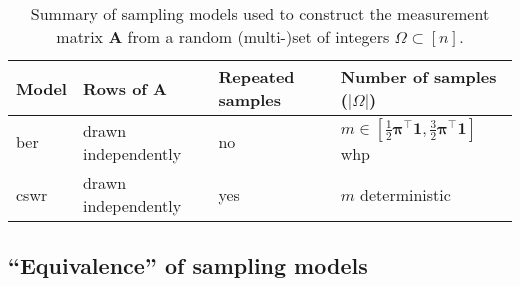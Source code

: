 \begin{table}[H]
    \begin{center}
        \begin{tabular}{ l l l l }
            \hline\noalign{\smallskip}
            Model & Rows of $\mathbf{A}$ & Repeated samples & Number of samples ($|\Omega|$) \\[.1cm]
            \hline\noalign{\smallskip}
            \acrshort{ber} & drawn independently & no & $m \in \left[ \frac{1}{2}\bm{\pi}^{\top} \mathbf{1}, \frac{3}{2}\bm{\pi}^{\top} \mathbf{1} \right ]$ \acrshort{whp} \\[.25cm]
            \acrshort{cswr} & drawn independently & yes & $m$ deterministic \\[.1cm]
            \hline
        \end{tabular}
    \end{center}
    \caption[Summary of sampling models]{Summary of sampling models used to construct the measurement matrix $\mathbf{A}$ from a random (multi-)set of integers $\Omega \subset [n]$.}
    \label{tab:sampling-models}
\end{table}

\clearpage

\begin{subappendices}
    \section{``Equivalence'' of sampling models}\label{ap:proof_equiv}
    
\end{subappendices}
